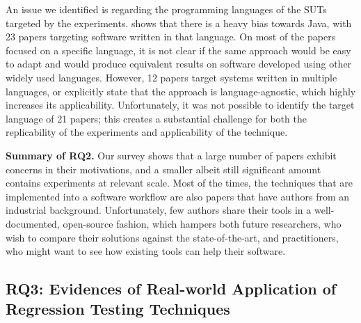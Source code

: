 An issue we identified is regarding the programming languages of the SUTs targeted by the experiments.
 shows that there is a heavy bias towards Java, with 23 papers targeting software written in that language.
On most of the papers focused on a specific language, it is not clear if the same approach would be easy to adapt and would produce equivalent results on software developed using other widely used languages.
However, 12 papers target systems written in multiple languages, or explicitly state that the approach is language-agnostic, which highly increases its applicability.
Unfortunately, it was not possible to identify the target language of 21 papers; this creates a substantial challenge for both the replicability of the experiments and applicability of the technique.




\begin{tcolorbox}%
\textbf{Summary of RQ2.}
Our survey shows that a large number of papers exhibit \rea concerns in their motivations, and a smaller albeit still significant amount contains experiments at relevant scale. 
Most of the times, the techniques that are implemented into a software workflow are also papers that have authors from an industrial background. %
Unfortunately, few authors share their tools in a well-documented, open-source fashion, which hampers both future researchers, who wish to compare their solutions against the state-of-the-art, and practitioners, who might want to see how existing \rt tools can help their software.
\end{tcolorbox}






\subsection{RQ3: Evidences of Real-world Application of Regression Testing Techniques}
\label{sec:lit_rq3}

